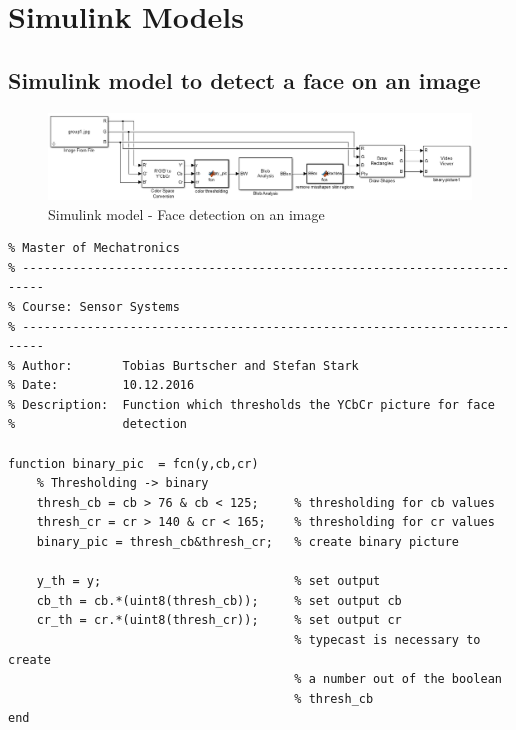 \documentclass[Bachelorarbeit.tex]{subfiles}
\begin{document}
\chapter{Simulink Models}
\section{Simulink model to detect a face on an image}\label{sec:SimulinkFaceImage}
\begin{figure}[!h]
\centering
\includegraphics[width=14cm]{./img/simulink/Simulink_ImageProcessing.PNG} 
\caption{Simulink model - Face detection on an image}
\label{SimModelImage}
\end{figure}

\begin{lstlisting}[caption=MATLAB function block - color thresholding]
% University of Applied Science Vorarlberg
% Master of Mechatronics
% -------------------------------------------------------------------------
% Course: Sensor Systems
% -------------------------------------------------------------------------
% Author:       Tobias Burtscher and Stefan Stark
% Date:         10.12.2016
% Description:  Function which thresholds the YCbCr picture for face
%               detection

function binary_pic  = fcn(y,cb,cr)
    % Thresholding -> binary
    thresh_cb = cb > 76 & cb < 125;     % thresholding for cb values
    thresh_cr = cr > 140 & cr < 165;    % thresholding for cr values
    binary_pic = thresh_cb&thresh_cr;   % create binary picture

    y_th = y;                           % set output
    cb_th = cb.*(uint8(thresh_cb));     % set output cb     
    cr_th = cr.*(uint8(thresh_cr));     % set output cr
                                        % typecast is necessary to create 
                                        % a number out of the boolean
                                        % thresh_cb
end
\end{lstlisting}
\end{document}
